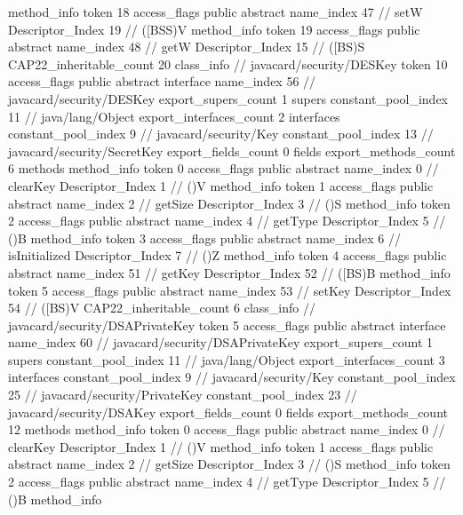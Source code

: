 {{{{				method_info {
					token	18
					access_flags	public abstract
					name_index	47		// setW
					Descriptor_Index	19		// ([BSS)V
				}
				method_info {
					token	19
					access_flags	public abstract
					name_index	48		// getW
					Descriptor_Index	15		// ([BS)S
				}
			}
			CAP22_inheritable_count	20
		}
		class_info {		// javacard/security/DESKey
			token	10
			access_flags	public abstract interface
			name_index	56		// javacard/security/DESKey
			export_supers_count	1
			supers {
				constant_pool_index	11		// java/lang/Object
			}
			export_interfaces_count	2
			interfaces {
				constant_pool_index	9		// javacard/security/Key
				constant_pool_index	13		// javacard/security/SecretKey
			}
			export_fields_count	0
			fields {
			}
			export_methods_count	6
			methods {
				method_info {
					token	0
					access_flags	public abstract
					name_index	0		// clearKey
					Descriptor_Index	1		// ()V
				}
				method_info {
					token	1
					access_flags	public abstract
					name_index	2		// getSize
					Descriptor_Index	3		// ()S
				}
				method_info {
					token	2
					access_flags	public abstract
					name_index	4		// getType
					Descriptor_Index	5		// ()B
				}
				method_info {
					token	3
					access_flags	public abstract
					name_index	6		// isInitialized
					Descriptor_Index	7		// ()Z
				}
				method_info {
					token	4
					access_flags	public abstract
					name_index	51		// getKey
					Descriptor_Index	52		// ([BS)B
				}
				method_info {
					token	5
					access_flags	public abstract
					name_index	53		// setKey
					Descriptor_Index	54		// ([BS)V
				}
			}
			CAP22_inheritable_count	6
		}
		class_info {		// javacard/security/DSAPrivateKey
			token	5
			access_flags	public abstract interface
			name_index	60		// javacard/security/DSAPrivateKey
			export_supers_count	1
			supers {
				constant_pool_index	11		// java/lang/Object
			}
			export_interfaces_count	3
			interfaces {
				constant_pool_index	9		// javacard/security/Key
				constant_pool_index	25		// javacard/security/PrivateKey
				constant_pool_index	23		// javacard/security/DSAKey
			}
			export_fields_count	0
			fields {
			}
			export_methods_count	12
			methods {
				method_info {
					token	0
					access_flags	public abstract
					name_index	0		// clearKey
					Descriptor_Index	1		// ()V
				}
				method_info {
					token	1
					access_flags	public abstract
					name_index	2		// getSize
					Descriptor_Index	3		// ()S
				}
				method_info {
					token	2
					access_flags	public abstract
					name_index	4		// getType
					Descriptor_Index	5		// ()B
				}
				method_info {
}}}}}
